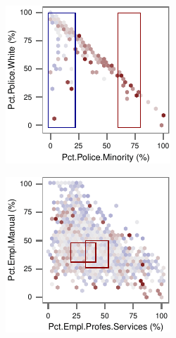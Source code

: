 \begin{figure}[t!]
    \begin{subfigure}[b]{0.45\columnwidth}
    \includegraphics[width=\textwidth]{plots/crime3}
    \end{subfigure}
    \begin{subfigure}[b]{0.45\columnwidth}
    \includegraphics[width=\textwidth]{plots/crime4}
    \end{subfigure}
    

\end{figure}
